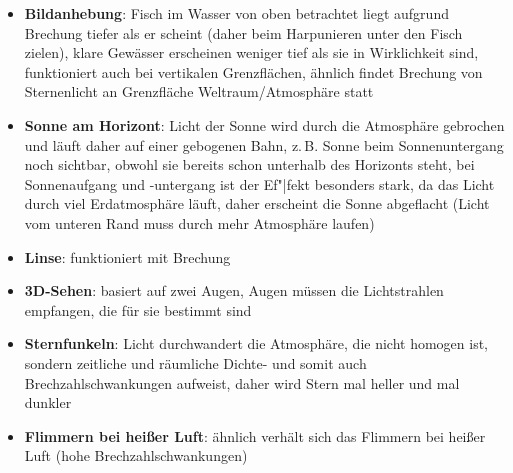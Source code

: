 \linie
\begin{itemize}
    \item
    \textbf{Bildanhebung}:
    Fisch im Wasser von oben betrachtet liegt aufgrund Brechung
    tiefer als er scheint (daher beim Harpunieren unter den Fisch zielen),
    klare Gewässer erscheinen weniger tief als sie in Wirklichkeit sind,
    funktioniert auch bei vertikalen Grenzflächen,
    ähnlich findet Brechung von Sternenlicht an Grenzfläche
    Weltraum/Atmosphäre statt
    
    \item
    \textbf{Sonne am Horizont}:
    Licht der Sonne wird durch die Atmosphäre gebrochen und läuft daher
    auf einer gebogenen Bahn, z.\,B. Sonne beim Sonnenuntergang
    noch sichtbar, obwohl sie bereits schon unterhalb des Horizonts steht,
    bei Sonnenaufgang und -untergang ist der Ef"|fekt besonders stark,
    da das Licht durch viel Erdatmosphäre läuft,
    daher erscheint die Sonne abgeflacht
    (Licht vom unteren Rand muss durch mehr Atmosphäre laufen)
\end{itemize}
\linie
\begin{itemize}
    \item
    \textbf{Linse}:
    funktioniert mit Brechung
    
    \item
    \textbf{3D-Sehen}:
    basiert auf zwei Augen,
    Augen müssen die Lichtstrahlen empfangen, die für sie bestimmt sind
\end{itemize}
\linie
\begin{itemize}
    \item
    \textbf{Sternfunkeln}:
    Licht durchwandert die Atmosphäre, die nicht homogen ist,
    sondern zeitliche und räumliche Dichte- und somit auch
    Brechzahlschwankungen aufweist, daher wird Stern mal heller und mal dunkler
    
    \item
    \textbf{Flimmern bei heißer Luft}:
    ähnlich verhält sich das Flimmern bei heißer Luft
    (hohe Brechzahlschwankungen)
\end{itemize}
\linie
\pagebreak
